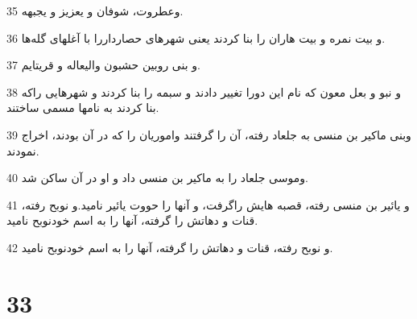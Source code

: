\par 35 وعطروت، شوفان و یعزیز و یجبهه.
\par 36 و بیت نمره و بیت هاران را بنا کردند یعنی شهرهای حصارداررا با آغلهای گله‌ها.
\par 37 و بنی روبین حشبون والیعاله و قریتایم.
\par 38 و نبو و بعل معون که نام این دورا تغییر دادند و سبمه را بنا کردند و شهرهایی راکه بنا کردند به نامها مسمی ساختند.
\par 39 وبنی ماکیر بن منسی به جلعاد رفته، آن را گرفتند واموریان را که در آن بودند، اخراج نمودند.
\par 40 وموسی جلعاد را به ماکیر بن منسی داد و او در آن ساکن شد.
\par 41 و یائیر بن منسی رفته، قصبه هایش راگرفت، و آنها را حووت یائیر نامید.و نوبح رفته، قنات و دهاتش را گرفته، آنها را به اسم خودنوبح نامید.
\par 42 و نوبح رفته، قنات و دهاتش را گرفته، آنها را به اسم خودنوبح نامید.
 
\chapter{33}

